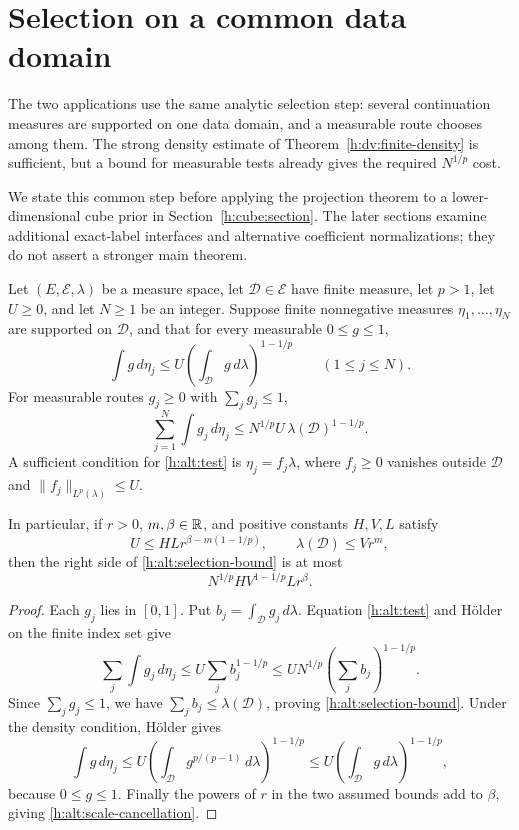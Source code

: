 \section{Selection on a common data domain}
\label{h:alternatives}

The two applications use the same analytic selection step: several
continuation measures are supported on one data domain, and a measurable
route chooses among them. The strong density estimate of
Theorem~\ref{h:dv:finite-density} is sufficient, but a bound for
measurable tests already gives the required \(N^{1/p}\) cost.

We state this common step before applying the projection theorem to a
lower-dimensional cube prior in Section~\ref{h:cube:section}.
The later sections examine additional exact-label interfaces and
alternative coefficient normalizations; they do not assert a stronger
main theorem.

\begin{lemma}\label{h:alt:selection}
Let \((E,\mathcal E,\lambda)\) be a measure space, let
\(\mathcal D\in\mathcal E\) have finite measure, let \(p>1\), let
\(U\ge0\), and let \(N\ge1\) be an integer. Suppose finite nonnegative measures
\(\eta_1,\ldots,\eta_N\) are supported on \(\mathcal D\), and that
for every measurable \(0\le g\le1\),
\begin{equation}\label{h:alt:test}
 \int g\,d\eta_j
 \le U\left(\int_{\mathcal D}g\,d\lambda\right)^{1-1/p}
 \qquad(1\le j\le N).
\end{equation}
For measurable routes \(g_j\ge0\) with \(\sum_jg_j\le1\),
\begin{equation}\label{h:alt:selection-bound}
 \sum_{j=1}^N\int g_j\,d\eta_j
 \le N^{1/p}U\,\lambda(\mathcal D)^{1-1/p}.
\end{equation}
A sufficient condition for \eqref{h:alt:test} is
\(\eta_j=f_j\lambda\), where \(f_j\ge0\) vanishes outside
\(\mathcal D\) and \(\|f_j\|_{L^p(\lambda)}\le U\).

In particular, if \(r>0\), \(m,\beta\in\mathbb R\), and positive constants
\(H,V,L\) satisfy
\[
 U\le HLr^{\beta-m(1-1/p)},\qquad
 \lambda(\mathcal D)\le Vr^m,
\]
then the right side of \eqref{h:alt:selection-bound} is at most
\begin{equation}\label{h:alt:scale-cancellation}
 N^{1/p}H V^{1-1/p}Lr^\beta.
\end{equation}
\end{lemma}

\begin{proof}
Each \(g_j\) lies in \([0,1]\). Put
\(b_j=\int_{\mathcal D}g_j\,d\lambda\). Equation
\eqref{h:alt:test} and H\"older on the finite index set give
\[
 \sum_j\int g_j\,d\eta_j
 \le U\sum_jb_j^{1-1/p}
 \le U N^{1/p}\left(\sum_jb_j\right)^{1-1/p}.
\]
Since \(\sum_jg_j\le1\), we have
\(\sum_jb_j\le\lambda(\mathcal D)\), proving
\eqref{h:alt:selection-bound}. Under the density condition,
H\"older gives
\[
 \int g\,d\eta_j
 \le U\left(\int_{\mathcal D}g^{p/(p-1)}\,d\lambda\right)^{1-1/p}
 \le U\left(\int_{\mathcal D}g\,d\lambda\right)^{1-1/p},
\]
because \(0\le g\le1\). Finally the powers of \(r\) in the two
assumed bounds add to \(\beta\), giving
\eqref{h:alt:scale-cancellation}.
\end{proof}

